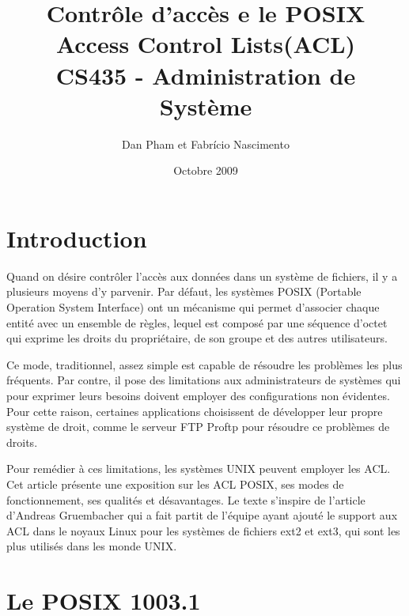 \usepackage[francais]{babel}
\usepackage[utf8]{inputenc}

\usepackage{graphicx} 

\usepackage{algorithmic}
\usepackage{algorithm}


\title{\textbf{Contrôle d'accès e le POSIX Access Control Lists(ACL)} \\ CS435 - Administration de Système }
\author{Dan Pham et Fabrício Nascimento}
\date{Octobre 2009}



\maketitle
\newpage

\section*{Introduction}
Quand on désire contrôler l'accès aux données dans un système de fichiers, il y a plusieurs moyens d’y parvenir. Par défaut, les systèmes POSIX (Portable Operation System Interface)\cite{ieee1,ieee2} ont un mécanisme qui permet d’associer chaque entité avec un ensemble de règles, lequel est composé par une séquence d'octet qui exprime les droits du propriétaire, de son groupe et des autres utilisateurs.

Ce mode, traditionnel, assez simple est capable de résoudre les problèmes les plus fréquents. Par contre, il pose des limitations aux administrateurs de systèmes qui pour exprimer leurs besoins doivent employer des configurations non évidentes. Pour cette raison, certaines applications choisissent de développer leur propre système de droit, comme le serveur FTP Proftp\cite{ftp} pour résoudre ce problèmes de droits.

Pour remédier à ces limitations, les systèmes UNIX peuvent employer les ACL. Cet article présente une exposition sur les ACL POSIX, ses modes de fonctionnement, ses qualités et désavantages. Le texte s’inspire de l'article d’Andreas Gruembacher\cite{aclsuse} qui a fait partit de l’équipe ayant ajouté le support aux ACL dans le noyaux Linux pour les systèmes de fichiers ext2 et ext3, qui sont les plus utilisés dans les monde UNIX.
\section{Le POSIX 1003.1}
 
